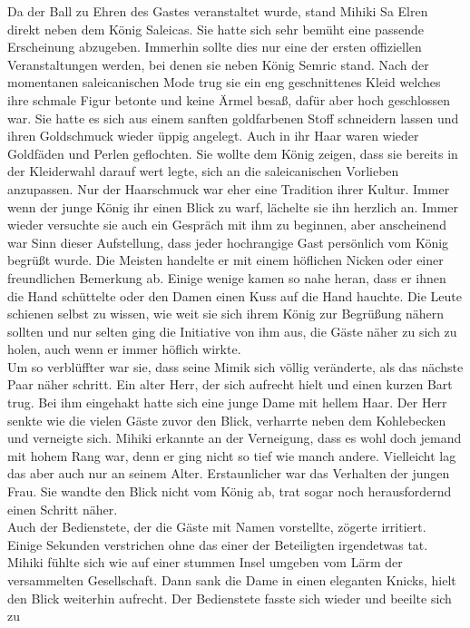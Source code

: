 Da der Ball zu Ehren des Gastes veranstaltet wurde, stand Mihiki Sa Elren direkt neben dem König 
Saleicas. Sie hatte sich sehr bemüht eine passende Erscheinung abzugeben. Immerhin sollte dies nur 
eine der ersten offiziellen Veranstaltungen werden, bei denen sie neben König Semric stand. Nach 
der momentanen saleicanischen Mode trug sie ein eng geschnittenes Kleid welches ihre schmale Figur 
betonte und keine Ärmel besaß, dafür aber hoch geschlossen war. Sie hatte es sich aus einem sanften 
goldfarbenen Stoff schneidern lassen und ihren Goldschmuck wieder üppig angelegt. Auch in ihr Haar 
waren wieder Goldfäden und Perlen geflochten. Sie wollte dem König zeigen, dass sie bereits in der 
Kleiderwahl darauf wert legte, sich an die saleicanischen Vorlieben anzupassen. Nur der Haarschmuck 
war eher eine Tradition ihrer Kultur. Immer wenn der junge König ihr einen Blick zu warf, lächelte 
sie ihn herzlich an. Immer wieder versuchte sie auch ein Gespräch mit ihm zu beginnen, aber 
anscheinend war Sinn dieser Aufstellung, dass jeder hochrangige Gast persönlich vom König 
begrüßt wurde. Die Meisten handelte er mit einem höflichen Nicken oder einer freundlichen Bemerkung 
ab. Einige wenige kamen so nahe heran, dass er ihnen die Hand schüttelte oder den Damen einen Kuss 
auf die Hand hauchte. Die Leute schienen selbst zu wissen, wie weit sie sich ihrem König zur 
Begrüßung nähern sollten und nur selten ging die Initiative von ihm aus, die Gäste näher zu sich zu 
holen, auch wenn er immer höflich wirkte.\\
Um so verblüffter war sie, dass seine Mimik sich völlig veränderte, als das nächste Paar näher 
schritt. Ein alter Herr, der sich aufrecht hielt und einen kurzen Bart trug. Bei ihm eingehakt 
hatte sich eine junge Dame mit hellem Haar. Der Herr senkte wie die vielen Gäste zuvor den Blick, 
verharrte neben dem Kohlebecken und verneigte sich. Mihiki erkannte an der Verneigung, dass es wohl 
doch jemand mit hohem Rang war, denn er ging nicht so tief wie manch andere. Vielleicht lag das 
aber auch nur an seinem Alter. Erstaunlicher war das Verhalten der jungen Frau. Sie wandte den 
Blick nicht vom König ab, trat sogar noch herausfordernd einen Schritt näher.\\
Auch der Bedienstete, der die Gäste mit Namen vorstellte, zögerte irritiert. Einige Sekunden 
verstrichen ohne das einer der Beteiligten irgendetwas tat. Mihiki fühlte sich wie auf einer 
stummen Insel umgeben vom Lärm der versammelten Gesellschaft. Dann sank die Dame in einen eleganten 
Knicks, hielt den Blick weiterhin aufrecht. Der Bedienstete fasste sich wieder und beeilte sich zu 
